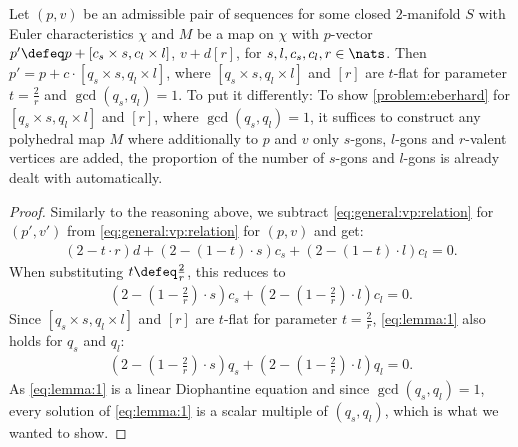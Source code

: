 \begin{lemma}\label{lem:2:valued:eberhard}
  Let $(p, v)$ be an admissible pair of sequences for some closed $2$-manifold $S$ with {\sc Euler} characteristics $\chi$ and $M$ be a map on $\chi$ with $p$-vector $p' \defeq p + [c_s \times s, c_l \times l]$, $v + d [r]$, for $s, l, c_s, c_l, r \in \nats$. Then $p' = p + c \cdot [q_s \times s, q_l \times l]$, where $[q_s \times s, q_l \times l]$ and $[r]$ are $t$-flat for parameter $t = \tfrac{2}{r}$ and $\gcd(q_s, q_l) = 1$. To put it differently: To show \autoref{problem:eberhard} for $[q_s \times s, q_l \times l]$ and $[r]$, where $\gcd(q_s, q_l) = 1$, it suffices to construct any polyhedral map $M$ where additionally to $p$ and $v$ only $s$-gons, $l$-gons and $r$-valent vertices are added, the proportion of the number of $s$-gons and $l$-gons is already dealt with automatically.
\begin{proof}
  Similarly to the reasoning above, we subtract \eqref{eq:general:vp:relation} for $(p', v')$ from \eqref{eq:general:vp:relation} for $(p, v)$ and get:
\begin{align*}
  (2 - t \cdot r) d + (2 - (1 - t) \cdot s) c_s +  (2 - (1 - t) \cdot l) c_l = 0. 
\end{align*}
When substituting $t \defeq \tfrac{2}{r}$, this reduces to
\begin{align}
  (2 - (1 - \tfrac{2}{r}) \cdot s) c_s + (2 - (1 - \tfrac{2}{r}) \cdot l) c_l = 0. \label{eq:lemma:1}
\end{align}
Since $[q_s \times s, q_l \times l]$ and $[r]$ are $t$-flat for parameter $t = \tfrac{2}{r}$, \eqref{eq:lemma:1} also holds for $q_s$ and $q_l$:
\begin{align}
  (2 - (1 - \tfrac{2}{r}) \cdot s) q_s + (2 - (1 - \tfrac{2}{r}) \cdot l) q_l = 0.
\end{align}
As \eqref{eq:lemma:1} is a linear {\sc Diophantine} equation and since $\gcd(q_s, q_l) = 1$, every solution of \eqref{eq:lemma:1} is a scalar multiple of $(q_s, q_l)$, which is what we wanted to show.
\end{proof}
\end{lemma}

